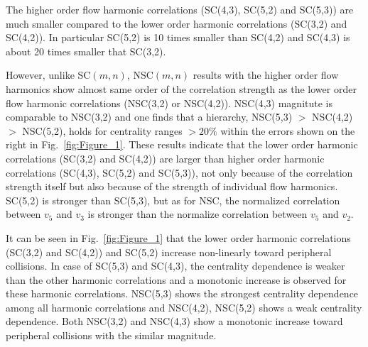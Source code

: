 The higher order flow harmonic correlations (SC(4,3), SC(5,2) and SC(5,3)) are much smaller compared to the lower order harmonic correlations (SC(3,2) and SC(4,2)).
In particular SC(5,2) is 10 times smaller than SC(4,2) and SC(4,3) is about 20 times smaller that SC(3,2).

However, unlike SC$(m,n)$, NSC$(m,n)$ results with the higher order flow harmonics show almost same order of the correlation strength as the lower order flow harmonic correlations (NSC(3,2) or NSC(4,2)).
NSC(4,3) magnitute is comparable to NSC(3,2) and one finds that a hierarchy, NSC(5,3) $>$ NSC(4,2) $>$ NSC(5,2), holds for centrality ranges $>20\%$ within the errors shown on the right in Fig.~\ref{fig:Figure_1}.
These results indicate that the lower order harmonic correlations (SC(3,2) and SC(4,2)) are larger than higher order harmonic correlations (SC(4,3), SC(5,2) and SC(5,3)), not only because of the correlation strength itself but also because of the strength of individual flow harmonics. 
SC(5,2) is stronger than SC(5,3), but as for NSC, the normalized correlation between $v_5$ and $v_3$ is stronger than the normalize correlation between $v_5$ and $v_2$. 

It can be seen in Fig.~\ref{fig:Figure_1} that the lower order harmonic correlations (SC(3,2) and SC(4,2)) and SC(5,2) increase non-linearly toward peripheral collisions.
In case of SC(5,3) and SC(4,3), the centrality dependence is weaker than the other harmonic correlations and a monotonic increase is observed for these harmonic correlations.
NSC(5,3) shows the strongest centrality dependence among all harmonic correlations and NSC(4,2), NSC(5,2) shows a weak centrality dependence.
Both NSC(3,2) and NSC(4,3) show a monotonic increase toward peripheral collisions with the similar magnitude.

